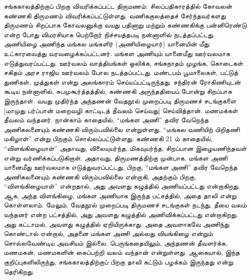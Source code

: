சங்ககாலத்திற்குப் பிறகு விவரிக்கப்பட்ட திருமணம்: சிலப்பதிகாரத்தில் கோவலன் கண்ணகி திருமணம் விவரிக்கப்பட்டுள்ளது. வணிககுலத்தைச் சேர்ந்தவர்களது திருமணம் சிறப்பாக கோவலனுக்கு வயது பதினாறு மற்றும் கண்ணகிக்கு பன்னிரெண்டு என்ற போது விமரசியாக பெற்றோர் நிச்சயத்தபடி நன்னாளில் நடத்தப்பட்டது. அணியிழை அணிந்த மங்கல மங்களிர் (அணியிழையார்) யானையின் மீது உட்காரவைத்து வரவழைக்கப்பட்டனர். மங்கள அணியும் யானைமீது ஊர்வலமாக எடுத்துவரப்பட்டது. ஊர்வலம் வாத்தியங்கள் ஒலிக்க, சங்கநாதம் முழங்க, கொடைகள் சகிதம் அரச ராஜிய ஊர்வலம் போல நடத்தப்பட்டது. மண்டபம் பூமாலைகள், பட்டுத் துணிகள், முத்துகள் என்று அலங்காரம் செய்யப்பட்டிருந்தது. சந்திரன் ரோகிணியுடன் கூடிய நன்னாளில், சுபமுகூர்த்தத்தில், கண்ணகி அருந்ததியைப் போன்று சிறப்பாக இருந்தாள். வயது முதிர்ந்த அந்தணன் வேதநூல் முறைப்படி திருமணச் சடங்குகளை [மாமுது பர்ப்பான் மறைவழி காட்டிடத் தீவலம் செய்வது] செய்வித்தான். மணமக்கள் தீவலம் வந்தனர். நான்காம் காதையில், “மங்கள அணி” தவிர வேறெந்த அணிகலனையும் கண்ணகி விரும்பவில்லை என்றுள்ளது. “மங்கல வணியிற் பிறிதணி மகிழாள்” என்று பிறகும் சொல்லப்பட்டுள்ளது. கண்ணகி 21 ம் காதையில், “விளங்கிழையாள்” அதாவது, விலையுயர்ந்த, மிகவுயர்ந்த, சிறப்பான இழையணிந்தவள் என்று வர்ணிக்கப்படுகிறாள். அதாவது, திருமணத்திற்கு முன்பாக, மங்கள அணி யானைமீது ஊர்வலமாக எடுத்துவரப்பட்டது, பிறகு, “மங்கள அணி” தவிர வேறெந்த அணிகலனையும் கண்ணகி விரும்பவில்லை என்றாகி, அதற்கும் பிறகு, “விளங்கிழையாள்” என்றதால், அது அவளது கழுத்தில் அணியப்பட்டது என்றாகிறது. ஆக, அந்த விளங்கிழை, மங்கள அணியாக இருந்த பட்சத்தில், அதை தாலி என்று கொள்ளலாம். மேலும், வேதநூல் முறைப்படி திருமணச் சடங்குகள் நடந்து, தீயை வலம் வந்தனர் என்ற பட்சத்தில், அது அவளது கழுத்தில் அணிவிக்கப்பட்டது என்றாகிறது. அது கட்டாமல், அவளது கழுத்தில் ஏறியிருக்காது. அதை அவளாகவே அணிந்து கொண்டால் என்றால், அதனை மங்கள அணி அல்லது வியங்கிழை என்றும் சொல்லவேண்டிய அவசியம் இல்லை. பெருங்கதையிலும், அந்தணன் தீவளர்க்க, மணமகன், மணமகளின் கைப்பற்றி வலம் வந்தான் என்றுள்ளது. ஆகையால், இந்த குறிப்புகளிலிருந்து, சங்ககாலத்திற்குப் பிறகு தாலி கட்டும் பழக்கம் இருந்தது என்று தெரிகிறது.

